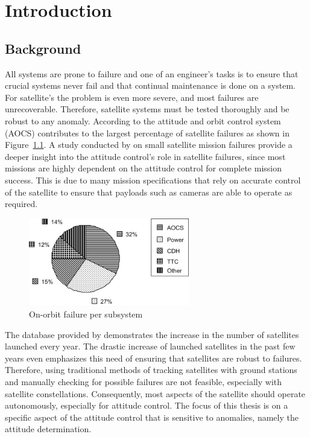 %
%


\chapter{Introduction}
\label{chap:Introduction}
\section{Background}
All systems are prone to failure and one of an engineer's tasks is to ensure that crucial systems never fail and that continual maintenance is done on a system. For satellite's the problem is even more severe, and most failures are unrecoverable. Therefore, satellite systems must be tested thoroughly and be robust to any anomaly. According to \cite{tafazoli2009study} the attitude and orbit control system (AOCS) contributes to the largest percentage of satellite failures as shown in Figure~\ref{fig:OnOrbitFailureSubsystem}. A study conducted by \cite{Jacklin2019} on small satellite mission failures provide a deeper insight into the attitude control's role in satellite failures, since most missions are highly dependent on the attitude control for complete mission success. This is due to many mission specifications that rely on accurate control of the satellite to ensure that payloads such as cameras are able to operate as required.

\begin{figure}[!htb]
	\centering
	\includegraphics[width = 7cm]{Figures/OnOrbitFailureDistribution.jpg}
	\caption{On-orbit failure per subsystem \cite{tafazoli2009study}}
	\label{fig:OnOrbitFailureSubsystem}
\end{figure}
The database provided by \cite{swartwout2015cubesat} demonstrates the increase in the number of satellites launched every year. The drastic increase of launched satellites in the past few years even emphasizes this need of ensuring that satellites are robust to failures. Therefore, using traditional methods of tracking satellites with ground stations and manually checking for possible failures are not feasible, especially with satellite constellations. Consequently, most aspects of the satellite should operate autonomously, especially for attitude control. The focus of this thesis is on a specific aspect of the attitude control that is sensitive to anomalies, namely the attitude determination. 

